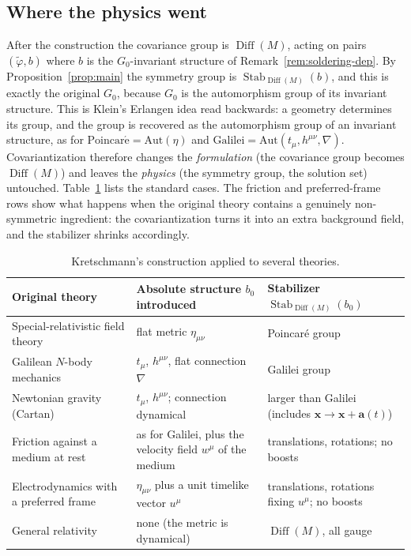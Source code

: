 \documentclass[11pt,a4paper,openany]{book}
\theoremstyle{definition}
\theoremstyle{plain}
\theoremstyle{remark}
\newcommand{\vx}{\bm{x}}
\DeclareMathOperator{\Stab}{Stab}
\DeclareMathOperator{\Diff}{Diff}
\begin{document}
\subsection{Where the physics went}

After the construction the covariance group is $\Diff(M)$, acting on pairs
$(\tilde\varphi,b)$ where $b$ is the $G_0$-invariant structure of
Remark~\ref{rem:soldering-dep}. By Proposition~\ref{prop:main} the symmetry
group is $\Stab_{\Diff(M)}(b)$, and this is exactly the original $G_0$, because
$G_0$ is the automorphism group of its invariant structure. This is Klein's
Erlangen idea read backwards: a geometry determines its group, and the group
is recovered as the automorphism group of an invariant structure, as for
$\mathrm{Poincar\acute e}=\mathrm{Aut}(\eta)$ and
$\text{Galilei}=\mathrm{Aut}(t_\mu,h^{\mu\nu},\nabla)$. Covariantization
therefore changes the \emph{formulation} (the covariance group becomes
$\Diff(M)$) and leaves the \emph{physics} (the symmetry group, the solution
set) untouched. Table~\ref{tab:kretschmannize} lists the standard cases. The
friction and preferred-frame rows show what happens when the original theory
contains a genuinely non-symmetric ingredient: the covariantization turns it
into an extra background field, and the stabilizer shrinks accordingly.

\begin{table}[ht]
\centering
\small
\renewcommand{\arraystretch}{1.25}
\setlength{\tabcolsep}{4pt}
\begin{tabular}{@{}>{\raggedright\arraybackslash}p{3.7cm}%
                  >{\raggedright\arraybackslash}p{5.6cm}%
                  >{\raggedright\arraybackslash}p{5.0cm}@{}}
\toprule
Original theory & Absolute structure $b_0$ introduced & Stabilizer $\Stab_{\Diff(M)}(b_0)$\\
\midrule
Special-relativistic field theory & flat metric $\eta_{\mu\nu}$ & Poincar\'e group\\
Galilean $N$-body mechanics & $t_\mu$, $h^{\mu\nu}$, flat connection $\nabla$ & Galilei group\\
Newtonian gravity (Cartan) & $t_\mu$, $h^{\mu\nu}$; connection dynamical
  & larger than Galilei (includes $\vx\to\vx+\bm a(t)$)\\
Friction against a medium at rest & as for Galilei, plus the velocity field
  $w^\mu$ of the medium & translations, rotations; no boosts\\
Electrodynamics with a preferred frame & $\eta_{\mu\nu}$ plus a unit timelike
  vector $u^\mu$ & translations, rotations fixing $u^\mu$; no boosts\\
General relativity & none (the metric is dynamical) & $\Diff(M)$, all gauge\\
\bottomrule
\end{tabular}
\caption{Kretschmann's construction applied to several theories.}
\label{tab:kretschmannize}
\end{table}
\end{document}
